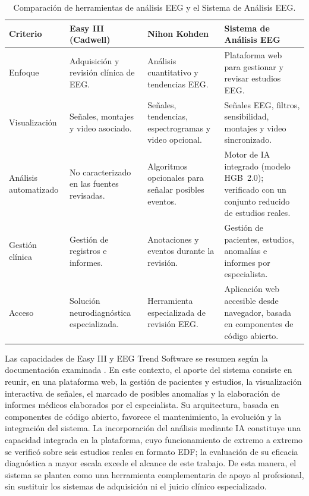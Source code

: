 \begin{table}[H]
\centering
\caption{Comparación de herramientas de análisis EEG y el Sistema de Análisis EEG.}
\label{tab:comparacion-herramientas-eeg}
\scriptsize
\setlength{\tabcolsep}{3pt}
\renewcommand{\arraystretch}{1.10}

\begin{tabular}{|
>{\raggedright\arraybackslash}p{2.2cm}|
>{\raggedright\arraybackslash}p{2.75cm}|
>{\raggedright\arraybackslash}p{2.75cm}|
>{\raggedright\arraybackslash}p{3.25cm}|}
\hline
\textbf{Criterio} &
\textbf{Easy III (Cadwell)} &
\textbf{Nihon Kohden} &
\textbf{Sistema de Análisis EEG} \\
\hline

Enfoque &
Adquisición y revisión clínica de EEG. &
Análisis cuantitativo y tendencias EEG. &
Plataforma web para gestionar y revisar estudios EEG. \\
\hline

Visualización &
Señales, montajes y video asociado. &
Señales, tendencias, espectrogramas y video opcional. &
Señales EEG, filtros, sensibilidad, montajes y video sincronizado. \\
\hline

Análisis automatizado &
No caracterizado en las fuentes revisadas. &
Algoritmos opcionales para señalar posibles eventos. &
Motor de IA integrado (modelo HGB~2.0); verificado con un conjunto reducido de estudios reales. \\
\hline

Gestión clínica &
Gestión de registros e informes. &
Anotaciones y eventos durante la revisión. &
Gestión de pacientes, estudios, anomalías e informes por especialista. \\
\hline

Acceso &
Solución neurodiagnóstica especializada. &
Herramienta especializada de revisión EEG. &
Aplicación web accesible desde navegador, basada en componentes de código abierto. \\
\hline

\end{tabular}
\end{table}

Las capacidades de Easy III y EEG Trend Software se resumen
según la documentación examinada \citep{CadwellEasyIII,CadwellEasyIIISpecifications,NihonKohdenEEGTrend}.
En este contexto, el aporte del sistema consiste en reunir, en una
plataforma web, la gestión de pacientes y estudios, la visualización
interactiva de señales, el marcado de posibles anomalías y la elaboración
de informes médicos elaborados por el especialista. Su arquitectura, basada en componentes de código abierto, favorece el mantenimiento, la evolución y la integración del sistema. La incorporación del análisis mediante IA constituye una capacidad integrada en la plataforma, cuyo funcionamiento de extremo a extremo se verificó sobre seis estudios reales en formato EDF; la evaluación de su eficacia diagnóstica a mayor escala excede el alcance de este trabajo.
De esta manera, el sistema se plantea
como una herramienta complementaria de apoyo al profesional, sin
sustituir los sistemas de adquisición ni el juicio clínico especializado.

